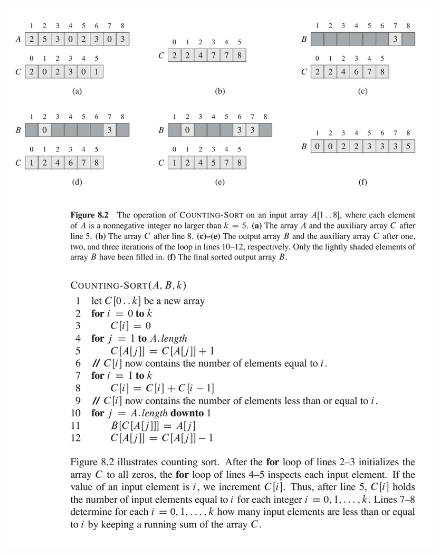 \documentclass[a4paper]{article} %
\begin{document}
		\begin{figure}[ht]
			\begin{center}
				\includegraphics[width=\textwidth,height=190mm]{Imagenes/countingsort/counting02.png}				
			\end{center} 
		\end{figure}
		\afterpage{\newpage}
		\newpage
		
\end{document}
